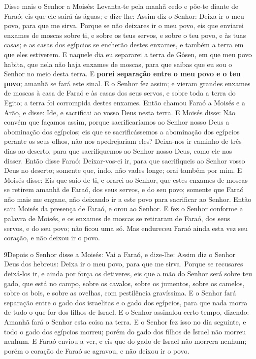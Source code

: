 Disse mais o Senhor a Moisés: Levanta-te pela manhã cedo e põe-te
diante de Faraó; eis que ele sairá às águas; e dize-lhe: Assim diz o
Senhor: Deixa ir o meu povo, para que me sirva. Porque se não
deixares ir o meu povo, eis que enviarei enxames de moscas sobre ti,
e sobre os teus servos, e sobre o teu povo, e às tuas casas; e as
casas dos egípcios se encherão destes enxames, e também a terra em
que eles estiverem. E naquele dia eu separarei a terra de
Gósen, em que meu povo habita, que nela não haja enxames de moscas,
para que saibas que eu sou o Senhor no meio desta terra. E
\textbf{porei separação entre o meu povo e o teu povo}; amanhã se
fará este sinal. E o Senhor fez assim; e vieram grandes
enxames de moscas à casa de Faraó e às casas dos seus servos, e
sobre toda a terra do Egito; a terra foi corrompida destes enxames.
Então chamou Faraó a Moisés e a Arão, e disse: Ide, e
sacrificai ao vosso Deus nesta terra. E Moisés disse: Não
convém que façamos assim, porque sacrificaríamos ao Senhor nosso
Deus a abominação dos egípcios; eis que se sacrificássemos a
abominação dos egípcios perante os seus olhos, não nos apedrejariam
eles? Deixa-nos ir caminho de três dias ao deserto, para que
sacrifiquemos ao Senhor nosso Deus, como ele nos disser.
Então disse Faraó: Deixar-vos-ei ir, para que sacrifiqueis ao
Senhor vosso Deus no deserto; somente que, indo, não vades longe;
orai também por mim. E Moisés disse: Eis que saio de ti, e
orarei ao Senhor, que estes enxames de moscas se retirem amanhã de
Faraó, dos seus servos, e do seu povo; somente que Faraó não mais me
engane, não deixando ir a este povo para sacrificar ao Senhor.
Então saiu Moisés da presença de Faraó, e orou ao Senhor.
E fez o Senhor conforme a palavra de Moisés, e os enxames de
moscas se retiraram de Faraó, dos seus servos, e do seu povo; não
ficou uma só. Mas endureceu Faraó ainda esta vez seu coração,
e não deixou ir o povo.

\medskip

\lettrine{9} Depois o Senhor disse a Moisés: Vai a Faraó, e
dize-lhe: Assim diz o Senhor Deus dos hebreus: Deixa ir o meu povo,
para que me sirva. Porque se recusares deixá-los ir, e ainda por
força os detiveres, eis que a mão do Senhor será sobre teu gado,
que está no campo, sobre os cavalos, sobre os jumentos, sobre os
camelos, sobre os bois, e sobre as ovelhas, com pestilência
gravíssima. E o Senhor fará separação entre o gado dos
israelitas e o gado dos egípcios, para que nada morra de tudo o que
for dos filhos de Israel. E o Senhor assinalou certo tempo,
dizendo: Amanhã fará o Senhor esta coisa na terra. E o Senhor
fez isso no dia seguinte, e todo o gado dos egípcios morreu; porém
do gado dos filhos de Israel não morreu nenhum. E Faraó enviou a
ver, e eis que do gado de Israel não morrera nenhum; porém o coração
de Faraó se agravou, e não deixou ir o povo.

